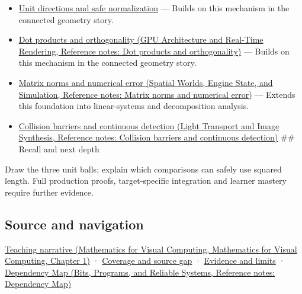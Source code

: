 \begin{itemize}
\item
  \hyperref[appendix-f744e41b95b4]{Unit directions and safe normalization} --- Builds on this mechanism in the connected geometry story.
\item
  \href{../06-GPU-Architecture-and-Real-Time-Rendering/main.pdf\#nameddest=appendix-8bc4e8fc547c}{Dot products and orthogonality (GPU Architecture and Real-Time Rendering, Reference notes: Dot products and orthogonality)} --- Builds on this mechanism in the connected geometry story.
\item
  \href{../05-Spatial-Worlds-Engine-State-and-Simulation/main.pdf\#nameddest=appendix-f8657bac66e5}{Matrix norms and numerical error (Spatial Worlds, Engine State, and Simulation, Reference notes: Matrix norms and numerical error)} --- Extends this foundation into linear-systems and decomposition analysis.
\item
  \href{../04-Light-Transport-and-Image-Synthesis/main.pdf\#nameddest=appendix-a9ba01fa72a6}{Collision barriers and continuous detection (Light Transport and Image Synthesis, Reference notes: Collision barriers and continuous detection)} \#\# Recall and next depth
\end{itemize}

Draw the three unit balls; explain which comparisons can safely use squared length. Full production proofs, target-specific integration and learner mastery require further evidence.

\subsection{Source and navigation}\label{appendix-49933872bb51-source-and-navigation}

\href{../02-Mathematics-for-Visual-Computing/main.pdf\#nameddest=01-foundations-i-ch017-a-ruler-needs-more-than-coordinate-components}{Teaching narrative (Mathematics for Visual Computing, Mathematics for Visual Computing, Chapter 1)} · \hyperref[appendix-fd090d982a15-phase-6---parts-501-600]{Coverage and source gap} · \hyperref[appendix-a103e7846d21-phase-6---source-analysis-and-verification]{Evidence and limits} · \href{../01-Bits-Programs-and-Reliable-Systems/main.pdf\#nameddest=appendix-4ad47bdd269a}{Dependency Map (Bits, Programs, and Reliable Systems, Reference notes: Dependency Map)}
